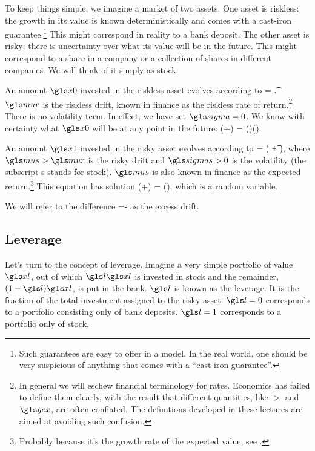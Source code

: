 To keep things simple, we imagine a market of two assets. One asset is riskless: the growth in its value is known deterministically and comes with a cast-iron guarantee.\footnote{Such guarantees are easy to offer in a model. In the real world, one should be very suspicious of anything that comes with a ``cast-iron guarantee''.} This might correspond in reality to a bank deposit. The other asset is risky: there is uncertainty over what its value will be in the future. This might correspond to a share in a company or a collection of shares in different companies. We will think of it simply as stock.

An amount $\xzero$ invested in the riskless asset evolves according to
\be
\gd\xzero = \xzero \mur \gd\t.
\ee
$\mur$ is the riskless drift, known in finance as the riskless rate of return.\footnote{In general we will eschew financial terminology for rates. Economics has failed to define them clearly, with the result that different quantities, like $\gt$ and $\gex$, are often conflated. The definitions developed in these lectures are aimed at avoiding such confusion.} There is no volatility term. In effect, we have set $\gsigma=0$. We know with certainty what $\xzero$ will be at any point in the future: 
\be
\xzero(\tn+\Dt) = \xzero(\tn)\exp(\mur\Dt).
\ee

An amount $\xone$ invested in the risky asset evolves according to
\be
\gd\xone = \xone ( \mus \gd\t + \sigmas \gd\gW ),
\ee
where $\mus>\mur$ is the risky drift and $\sigmas>0$ is the volatility (the subscript s stands for stock). $\mus$ is also known in finance as the expected return.\footnote{Probably because it's the growth rate of the expected value, see .} This equation has solution
\be
\xone(\tn+\Dt) = \xone(\tn)\exp{},
\ee
which is a random variable.

We will refer to the difference
\be
\mue=\mus-\mur
{}
\ee
as the excess drift. 

\subsection{Leverage}
Let's turn to the concept of leverage. Imagine a very simple portfolio of value $\xl$, out of which $\l \xl$ is invested in stock and the remainder, $(1-\l)\xl$, is put in the bank. $\l$ is known as the leverage. It is the fraction of the total investment assigned to the risky asset. $\l=0$ corresponds to a portfolio consisting only of bank deposits. $\l=1$ corresponds to a portfolio only of stock.

